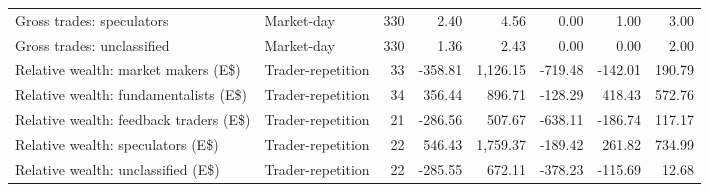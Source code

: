 \begin{tabular}{llrrrrrr}
Gross trades: speculators & Market-day & 330 & 2.40 & 4.56 & 0.00 & 1.00 & 3.00 \\
Gross trades: unclassified & Market-day & 330 & 1.36 & 2.43 & 0.00 & 0.00 & 2.00 \\
Relative wealth: market makers (E\$) & Trader-repetition & 33 & -358.81 & 1,126.15 & -719.48 & -142.01 & 190.79 \\
Relative wealth: fundamentalists (E\$) & Trader-repetition & 34 & 356.44 & 896.71 & -128.29 & 418.43 & 572.76 \\
Relative wealth: feedback traders (E\$) & Trader-repetition & 21 & -286.56 & 507.67 & -638.11 & -186.74 & 117.17 \\
Relative wealth: speculators (E\$) & Trader-repetition & 22 & 546.43 & 1,759.37 & -189.42 & 261.82 & 734.99 \\
Relative wealth: unclassified (E\$) & Trader-repetition & 22 & -285.55 & 672.11 & -378.23 & -115.69 & 12.68 \\
\bottomrule
\end{tabular}
